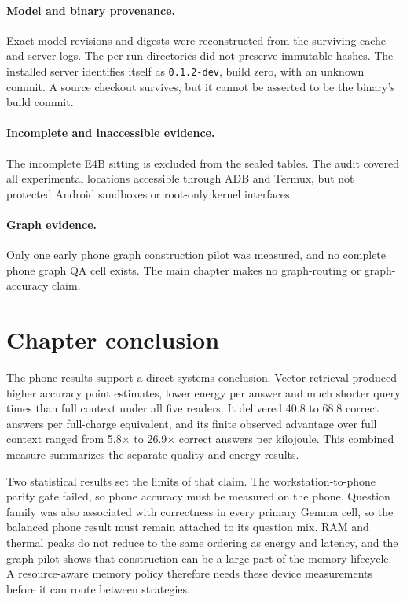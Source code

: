 \paragraph{Model and binary provenance.}
Exact model revisions and digests were reconstructed from the surviving cache and
server logs. The per-run directories did not preserve immutable hashes. The installed
server identifies itself as \texttt{0.1.2-dev}, build zero, with an unknown commit. A
source checkout survives, but it cannot be asserted to be the binary's build commit.

\paragraph{Incomplete and inaccessible evidence.}
The incomplete E4B sitting is excluded from the sealed tables. The audit covered all
experimental locations accessible through ADB and Termux, but not protected Android
sandboxes or root-only kernel interfaces.

\paragraph{Graph evidence.}
Only one early phone graph construction pilot was measured, and no complete phone graph
QA cell exists. The main chapter makes no graph-routing or graph-accuracy claim.

\section{Chapter conclusion}
\label{sec:ch5_conclusion}

The phone results support a direct systems conclusion. Vector retrieval produced higher
accuracy point estimates, lower energy per answer and much shorter query times than
full context under all five readers. It delivered 40.8 to 68.8 correct answers per
full-charge equivalent, and its finite observed advantage over full context ranged from
5.8$\times$ to 26.9$\times$ correct answers per kilojoule. This combined measure summarizes the
separate quality and energy results.

Two statistical results set the limits of that claim. The workstation-to-phone parity
gate failed, so phone accuracy must be measured on the phone. Question family was also
associated with correctness in every primary Gemma cell, so the balanced phone result
must remain attached to its question mix. RAM and thermal peaks do not reduce to the
same ordering as energy and latency, and the graph pilot shows that construction can be
a large part of the memory lifecycle. A resource-aware memory policy therefore needs these
device measurements before it can route between strategies.
